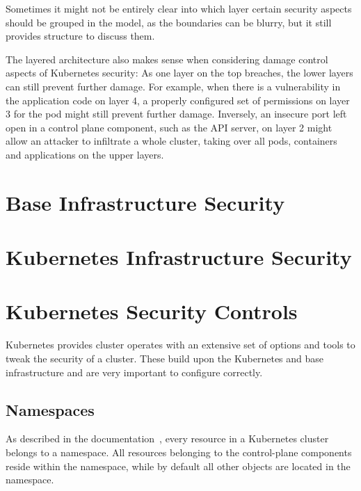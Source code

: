 Sometimes it might not be entirely clear into which layer certain security aspects should be grouped in the model, as the boundaries can be blurry, but it still provides structure to discuss them.

The layered architecture also makes sense when considering damage control aspects of Kubernetes security: As one layer on the top breaches, the lower layers can still prevent further damage. For example, when there is a vulnerability in the application code on layer 4, a properly configured set of permissions on layer 3 for the pod might still prevent further damage. Inversely, an insecure port left open in a control plane component, such as the API server, on layer 2 might allow an attacker to infiltrate a whole cluster, taking over all pods, containers and applications on the upper layers. 
	
\section{Base Infrastructure Security} \label{sec:layer1}


\section{Kubernetes Infrastructure Security} \label{sec:layer2}


\section{Kubernetes Security Controls} \label{sec:layer3}

Kubernetes provides cluster operates with an extensive set of options and tools to tweak the security of a cluster. These build upon the Kubernetes and base infrastructure and are very important to configure correctly. 

\subsection{Namespaces} \label{sec:namespaces}

As described in the documentation~\textcite{k8sdocs}, every resource in a Kubernetes cluster belongs to a namespace. All resources belonging to the control-plane components reside within the  namespace, while by default all other objects are located in the  namespace. 

